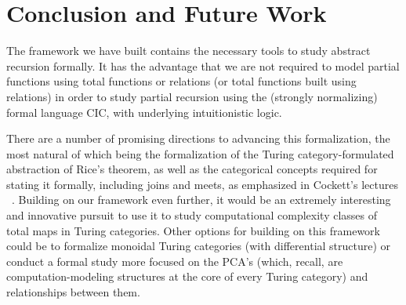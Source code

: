 \documentclass{entcs} \usepackage{entcsmacro}
\begin{document}
\section{Conclusion and Future Work}

The framework we have built contains the necessary tools to study abstract recursion formally. It has the advantage that we are not required to model partial functions using total functions or relations (or total functions built using relations) in order to study partial recursion using the (strongly normalizing) formal language CIC, with underlying intuitionistic logic. 

There are a number of promising directions to advancing this formalization, the most natural of which being the formalization of the Turing category-formulated abstraction of Rice's theorem, as well as the categorical concepts required for stating it formally, including joins and meets, as emphasized in Cockett's lectures ~\cite{Estonia}. Building on our framework even further, it would be an extremely interesting and innovative pursuit to use it to study computational complexity classes of total maps in Turing categories. Other options for building on this framework could be to formalize monoidal Turing categories (with differential structure) or conduct a formal
study more focused on the PCA's (which, recall, are computation-modeling structures
at the core of every Turing category) and relationships between them. 








\end{document}
